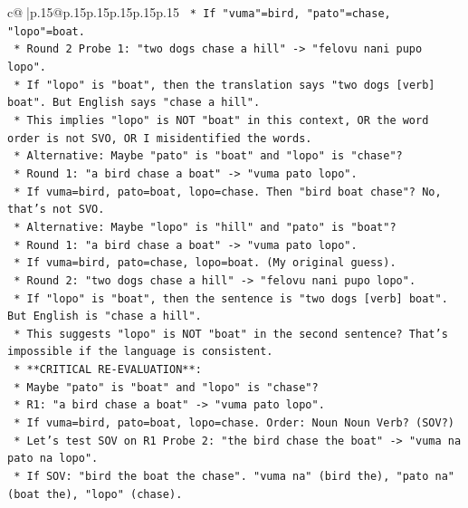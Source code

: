 \documentclass{article}
\begin{document}
{\begin{supertabular}{c@{$\;$}|p{.15\linewidth}@{}p{.15\linewidth}p{.15\linewidth}p{.15\linewidth}p{.15\linewidth}p{.15\linewidth}}
{{{\texttt{        *   If "vuma"=bird, "pato"=chase, "lopo"=boat.} \\
\texttt{        *   Round 2 Probe 1: "two dogs chase a hill" {-}> "felovu nani pupo lopo".} \\
\texttt{        *   If "lopo" is "boat", then the translation says "two dogs {[}verb{]} boat". But English says "chase a hill".} \\
\texttt{        *   This implies "lopo" is NOT "boat" in this context, OR the word order is not SVO, OR I misidentified the words.} \\
\texttt{        *   Alternative: Maybe "pato" is "boat" and "lopo" is "chase"?} \\
\texttt{            *   Round 1: "a bird chase a boat" {-}> "vuma pato lopo".} \\
\texttt{            *   If vuma=bird, pato=boat, lopo=chase. Then "bird boat chase"? No, that's not SVO.} \\
\texttt{        *   Alternative: Maybe "lopo" is "hill" and "pato" is "boat"?} \\
\texttt{            *   Round 1: "a bird chase a boat" {-}> "vuma pato lopo".} \\
\texttt{            *   If vuma=bird, pato=chase, lopo=boat. (My original guess).} \\
\texttt{            *   Round 2: "two dogs chase a hill" {-}> "felovu nani pupo lopo".} \\
\texttt{            *   If "lopo" is "boat", then the sentence is "two dogs {[}verb{]} boat". But English is "chase a hill".} \\
\texttt{            *   This suggests "lopo" is NOT "boat" in the second sentence? That's impossible if the language is consistent.} \\
\texttt{            *   **CRITICAL RE{-}EVALUATION**:} \\
\texttt{            *   Maybe "pato" is "boat" and "lopo" is "chase"?} \\
\texttt{                *   R1: "a bird chase a boat" {-}> "vuma pato lopo".} \\
\texttt{                *   If vuma=bird, pato=boat, lopo=chase. Order: Noun Noun Verb? (SOV?)} \\
\texttt{                *   Let's test SOV on R1 Probe 2: "the bird chase the boat" {-}> "vuma na pato na lopo".} \\
\texttt{                *   If SOV: "bird the boat the chase". "vuma na" (bird the), "pato na" (boat the), "lopo" (chase).} \\
}}}
\end{supertabular}}
\end{document}

